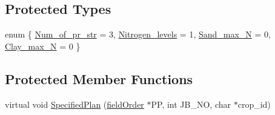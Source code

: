 \subsection*{Protected Types}
\begin{DoxyCompactItemize}
\item 
enum \{ \hyperlink{classstatic_pea_a173ff47f02ff527bdd0cd9e8516a9e68a3df78686adfc12ef0af3cfea571e3d77}{Num\_\-of\_\-pr\_\-str} = 3, 
\hyperlink{classstatic_pea_a173ff47f02ff527bdd0cd9e8516a9e68ab79d25463a6591ce72cf2f9185461608}{Nitrogen\_\-levels} = 1, 
\hyperlink{classstatic_pea_a173ff47f02ff527bdd0cd9e8516a9e68ab65fba8b5a40eeba2bdbb1b1507d6d43}{Sand\_\-max\_\-N} = 0, 
\hyperlink{classstatic_pea_a173ff47f02ff527bdd0cd9e8516a9e68a8035d9c5ef410c52d62f1c5fc94e8061}{Clay\_\-max\_\-N} = 0
 \}
\end{DoxyCompactItemize}
\subsection*{Protected Member Functions}
\begin{DoxyCompactItemize}
\item 
virtual void \hyperlink{classstatic_pea_aa4d8917d0c11523a65c5abd929a9bd7c}{SpecifiedPlan} (\hyperlink{classfield_order}{fieldOrder} $\ast$PP, int JB\_\-NO, char $\ast$crop\_\-id)
\end{DoxyCompactItemize}


